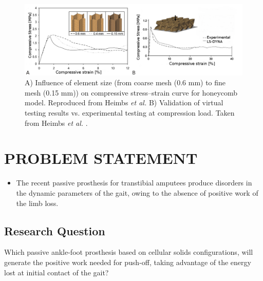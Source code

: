 \documentclass[12pt,english]{article}
\begin{document}
\begin{figure}
\begin{centering}

\includegraphics[scale=0.41]{stress-strainFEM2Eng}
\par\end{centering}

\caption{\label{fig:CellularFEM} A) Influence of element size (from coarse mesh (0.6
mm) to fine mesh (0.15 mm)) on compressive stress–strain curve for honeycomb model. Reproduced from Heimbs \emph{et al.} B) Validation of virtual testing results vs. experimental testing at compression load. Taken from Heimbs \emph{et al.} \cite{Heimbs2009}.}
\end{figure}






\section{PROBLEM STATEMENT}
\begin{itemize}
\item The recent passive prosthesis for transtibial amputees produce disorders in the dynamic parameters of the gait, owing to the absence of positive work of the limb loss. 
\end{itemize}

\subsection{Research Question}

Which passive ankle-foot prosthesis based on cellular solids configurations, will generate the positive work needed for push-off, taking advantage of the energy lost at initial contact of the gait?
\end{document}

